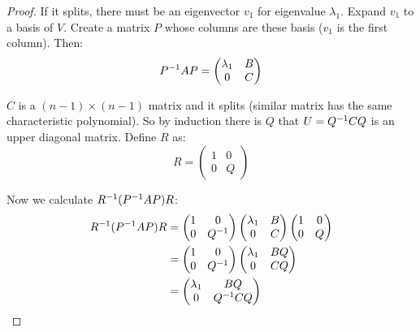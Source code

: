 \begin{proof}
    If it splits, there must be an eigenvector $v_1$ for eigenvalue $\lambda_1$. Expand $v_1$ to a basis of $V$. Create a matrix $P$ whose columns are these basis ($v_1$ is the first column). Then:
    \begin{equation*}
        {P}^{-1} A P = \begin{pmatrix}
            \lambda_1 & B \\
            0 & C
        \end{pmatrix}
    \end{equation*}
    
    $C$ is a $(n-1) \times (n-1)$ matrix and it splits (similar matrix has the same characteristic polynomial). So by induction there is $Q$ that $U= {Q}^{-1} C Q$ is an upper diagonal matrix. Define $R$ as:
    \begin{equation*}
        R = \begin{pmatrix}
            1 & 0 \\
            0 & Q
        \end{pmatrix}
    \end{equation*}
    
    Now we calculate ${R}^{-1} ({P}^{-1} A P) R$:
    \begin{equation*}
        \begin{aligned}
            {R}^{-1} ({P}^{-1} A P) R  &= \begin{pmatrix}
                1 & 0 \\
                0 & {Q}^{-1}
            \end{pmatrix} \begin{pmatrix}
                \lambda_1 & B \\
                0 & C
            \end{pmatrix} \begin{pmatrix}
                1 & 0 \\
                0 & Q
            \end{pmatrix} \\
            & = \begin{pmatrix}
                1 & 0 \\
                0 & {Q}^{-1}
            \end{pmatrix} \begin{pmatrix}
                \lambda_1 & B Q \\
                0 & C Q
            \end{pmatrix} \\
            &= \begin{pmatrix}
                \lambda_1 & BQ \\
                0 & {Q}^{-1} C Q
            \end{pmatrix}
        \end{aligned}     
    \end{equation*}
\end{proof}

